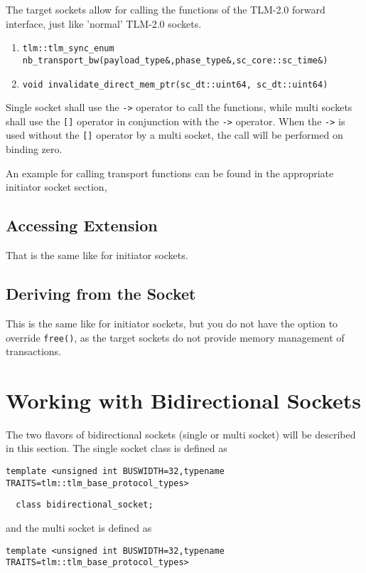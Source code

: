 \documentclass[a4paper,10pt]{article}          %
\begin{document}
The target sockets allow for calling the functions of the TLM-2.0 forward interface, just like 'normal' TLM-2.0 sockets.

\begin{enumerate}
\item 
\verb|tlm::tlm_sync_enum nb_transport_bw(payload_type&,phase_type&,sc_core::sc_time&)|
\item 
\verb|void invalidate_direct_mem_ptr(sc_dt::uint64, sc_dt::uint64)|
\end{enumerate}


Single socket shall use the \verb|->| operator to call the functions, while multi sockets shall use the \verb|[]| operator in conjunction with the \verb|->| operator.
When the \verb|->| is used without the \verb|[]| operator by a multi socket, the call will be performed on binding zero.

An example for calling transport functions can be found in the appropriate initiator socket section,

\subsection{Accessing Extension}

That is the same like for initiator sockets.

\subsection{Deriving from the Socket}

This is the same like for initiator sockets, but you do not have the option to override \verb|free()|, as the target sockets do not provide memory management of transactions.

\section{Working with Bidirectional Sockets}

The two flavors of bidirectional sockets (single or multi socket) will be described in this section. The single socket class is defined as 

\verb|template <unsigned int BUSWIDTH=32,typename TRAITS=tlm::tlm_base_protocol_types>|

\verb|  class bidirectional_socket;|

\noindent and the multi socket is defined as

\verb|template <unsigned int BUSWIDTH=32,typename TRAITS=tlm::tlm_base_protocol_types>|
\end{document}
